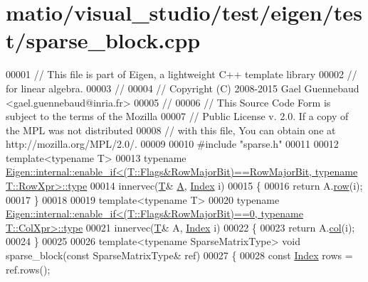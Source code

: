 \hypertarget{matio_2visual__studio_2test_2eigen_2test_2sparse__block_8cpp_source}{}\section{matio/visual\+\_\+studio/test/eigen/test/sparse\+\_\+block.cpp}
\label{matio_2visual__studio_2test_2eigen_2test_2sparse__block_8cpp_source}

\begin{DoxyCode}
00001 \textcolor{comment}{// This file is part of Eigen, a lightweight C++ template library}
00002 \textcolor{comment}{// for linear algebra.}
00003 \textcolor{comment}{//}
00004 \textcolor{comment}{// Copyright (C) 2008-2015 Gael Guennebaud <gael.guennebaud@inria.fr>}
00005 \textcolor{comment}{//}
00006 \textcolor{comment}{// This Source Code Form is subject to the terms of the Mozilla}
00007 \textcolor{comment}{// Public License v. 2.0. If a copy of the MPL was not distributed}
00008 \textcolor{comment}{// with this file, You can obtain one at http://mozilla.org/MPL/2.0/.}
00009 
00010 \textcolor{preprocessor}{#include "sparse.h"}
00011 
00012 \textcolor{keyword}{template}<\textcolor{keyword}{typename} T>
00013 \textcolor{keyword}{typename} 
      \hyperlink{struct_eigen_1_1internal_1_1enable__if}{Eigen::internal::enable\_if<(T::Flags&RowMajorBit)==RowMajorBit, typename T::RowXpr>::type}
00014 innervec(\hyperlink{group___sparse_core___module}{T}& \hyperlink{group___core___module_class_eigen_1_1_matrix}{A}, \hyperlink{namespace_eigen_a62e77e0933482dafde8fe197d9a2cfde}{Index} i)
00015 \{
00016   \textcolor{keywordflow}{return} A.\hyperlink{group___sparse_core___module_ae88b0ad6d31daa53e298b9cc4201fdee}{row}(i);
00017 \}
00018 
00019 \textcolor{keyword}{template}<\textcolor{keyword}{typename} T>
00020 \textcolor{keyword}{typename} 
      \hyperlink{struct_eigen_1_1internal_1_1enable__if}{Eigen::internal::enable\_if<(T::Flags&RowMajorBit)==0, typename T::ColXpr>::type}
00021 innervec(\hyperlink{group___sparse_core___module}{T}& A, \hyperlink{namespace_eigen_a62e77e0933482dafde8fe197d9a2cfde}{Index} i)
00022 \{
00023   \textcolor{keywordflow}{return} A.\hyperlink{group___sparse_core___module_a3531e3e2098507a069a368d72d46471e}{col}(i);
00024 \}
00025 
00026 \textcolor{keyword}{template}<\textcolor{keyword}{typename} SparseMatrixType> \textcolor{keywordtype}{void} sparse\_block(\textcolor{keyword}{const} SparseMatrixType& ref)
00027 \{
00028   \textcolor{keyword}{const} \hyperlink{namespace_eigen_a62e77e0933482dafde8fe197d9a2cfde}{Index} rows = ref.rows();

\end{DoxyCode}
